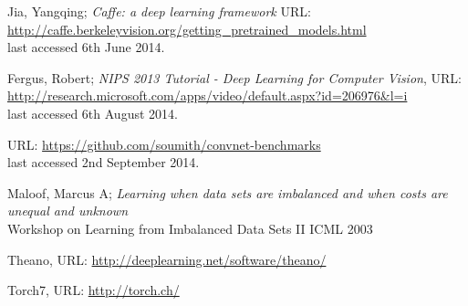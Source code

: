 \documentclass[a4paper,11pt]{article}
\begin{document}
\begin{thebibliography}{1}
 Jia, Yangqing;
 \emph{Caffe: a deep learning framework} 
 URL: \url{http://caffe.berkeleyvision.org/getting_pretrained_models.html}\\ last accessed 6th June 2014.

 Fergus, Robert;
 \emph{NIPS 2013 Tutorial - Deep Learning for Computer Vision},
 URL: \url{http://research.microsoft.com/apps/video/default.aspx?id=206976&l=i}\\ last accessed 6th August 2014.

 URL: \url{https://github.com/soumith/convnet-benchmarks}\\ last accessed 2nd September 2014.

 Maloof, Marcus A;
 \emph{Learning when data sets are imbalanced and when costs are unequal and unknown}\\
 Workshop on Learning from Imbalanced Data Sets II
 ICML 2003
 
 Theano,
 URL: \url{http://deeplearning.net/software/theano/}
 
 Torch7,
 URL: \url{http://torch.ch/} 

\end{thebibliography}
\end{document}
